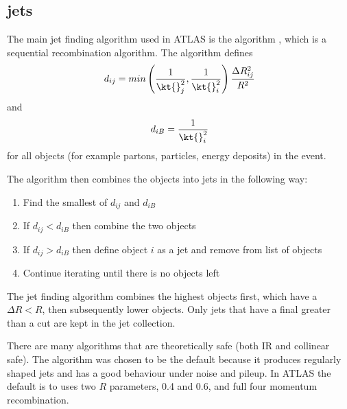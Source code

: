\subsection{\Antikt{} jets}

The main jet finding algorithm used in ATLAS is the \antikt{} algorithm \cite{ref:antiKt}, which is a sequential recombination algorithm.
The algorithm defines 
\begin{equation}
d_{ij} = min\left( \frac{1}{\kt{}_j^2},\frac{1}{\kt{}_i^2}\right) \frac{\Delta R_{ij}^2}{R^2}
\label{Theory:dij}
\end{equation}
and 
\begin{equation}
d_{iB} = \frac{1}{\kt{}_i^2}
\label{Theory:diB}
\end{equation}
for all objects (for example partons, particles, energy deposits) in the event.

The algorithm then combines the objects into jets in the following way:

\begin{enumerate}
\item Find the smallest of $d_{ij}$ and $d_{iB}$
\item If $d_{ij} < d_{iB}$ then combine the two objects
\item If $d_{ij} > d_{iB}$ then define object $i$ as a jet and remove from list of objects
\item Continue iterating until there is no objects left 
\end{enumerate}

The jet finding algorithm combines the highest \pt{} objects first, which have a  $\Delta R  < R$, then subsequently lower \pt{} objects.
Only jets that have a final \pt{} greater than a \pt{} cut are kept in the jet collection. 

There are many algorithms that are theoretically safe (both IR and collinear safe).
The \antikt{} algorithm was chosen to be the default because it produces regularly shaped jets and has a good behaviour under noise and pileup. 
In ATLAS the default is to uses two $R$ parameters, 0.4 and 0.6, and full four momentum recombination.

